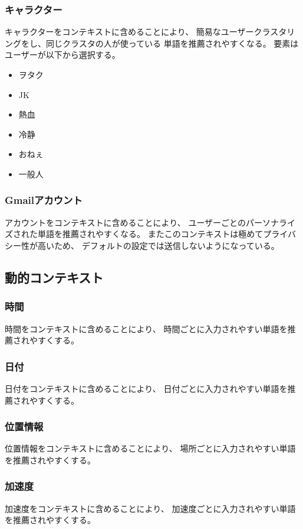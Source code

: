 \subsubsection{キャラクター}
キャラクターをコンテキストに含めることにより、
簡易なユーザークラスタリングをし、同じクラスタの人が使っている
単語を推薦されやすくなる。
要素はユーザーが以下から選択する。
\begin{itemize}
  \item ヲタク
  \item JK
  \item 熱血
  \item 冷静
  \item おねぇ
  \item 一般人
\end{itemize}

\subsubsection{Gmailアカウント}
アカウントをコンテキストに含めることにより、
ユーザーごとのパーソナライズされた単語を推薦されやすくなる。
またこのコンテキストは極めてプライバシー性が高いため、
デフォルトの設定では送信しないようになっている。

\subsection{動的コンテキスト}

\subsubsection{時間}
時間をコンテキストに含めることにより、
時間ごとに入力されやすい単語を推薦されやすくする。

\subsubsection{日付}
日付をコンテキストに含めることにより、
日付ごとに入力されやすい単語を推薦されやすくする。

\subsubsection{位置情報}
位置情報をコンテキストに含めることにより、
場所ごとに入力されやすい単語を推薦されやすくする。

\subsubsection{加速度}
加速度をコンテキストに含めることにより、
加速度ごとに入力されやすい単語を推薦されやすくする。

